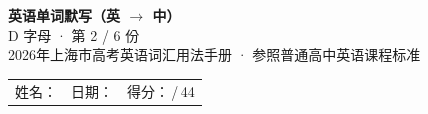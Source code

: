 \documentclass[10pt,a4paper]{article}
\begin{document}
\pagestyle{plain}

\begin{center}
{\LARGE\bfseries 英语单词默写（英 $\to$ 中）}\\[0.22em]
{\large D 字母 · 第 2 / 6 份}\\[0.18em]
{\small 2026年上海市高考英语词汇用法手册 · 参照普通高中英语课程标准}
\end{center}

\vspace{0.25em}
\noindent\begin{tabular}{@{}p{}@{}p{}@{}p{}@{}}
姓名：\underline{\hspace{2.0cm}} & 日期：\underline{\hspace{2.0cm}} & 得分：\underline{\hspace{1.3cm}}\,/\,44 \\
\end{tabular}

\vspace{0.3em}

\vspace{0.08em}
\end{document}

